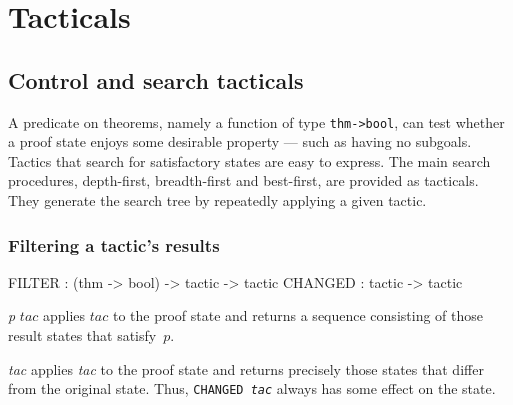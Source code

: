 
\chapter{Tacticals}

\section{Control and search tacticals}

A predicate on theorems, namely a function of type \hbox{\tt thm->bool},
can test whether a proof state enjoys some desirable property --- such as
having no subgoals.  Tactics that search for satisfactory states are easy
to express.  The main search procedures, depth-first, breadth-first and
best-first, are provided as tacticals.  They generate the search tree by
repeatedly applying a given tactic.


\subsection{Filtering a tactic's results}
\begin{ttbox} 
FILTER  : (thm -> bool) -> tactic -> tactic
CHANGED : tactic -> tactic
\end{ttbox}
\begin{ttdescription}
\item[\ttindexbold{FILTER} {\it p} $tac$] 
applies $tac$ to the proof state and returns a sequence consisting of those
result states that satisfy~$p$.

\item[\ttindexbold{CHANGED} {\it tac}] 
applies {\it tac\/} to the proof state and returns precisely those states
that differ from the original state.  Thus, \hbox{\tt CHANGED {\it tac}}
always has some effect on the state.
\end{ttdescription}


